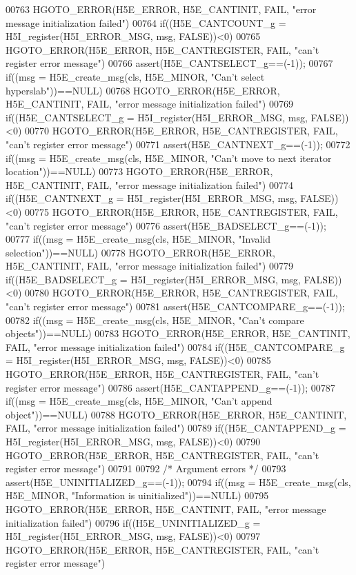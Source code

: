 \begin{DoxyCode}
00763     HGOTO\_ERROR(H5E\_ERROR, H5E\_CANTINIT, FAIL, "error message initialization failed")
00764 if((H5E\_CANTCOUNT\_g = H5I\_register(H5I\_ERROR\_MSG, msg, FALSE))<0)
00765     HGOTO\_ERROR(H5E\_ERROR, H5E\_CANTREGISTER, FAIL, "can't register error message")
00766 assert(H5E\_CANTSELECT\_g==(-1));
00767 if((msg = H5E\_create\_msg(cls, H5E\_MINOR, "Can't select hyperslab"))==NULL)
00768     HGOTO\_ERROR(H5E\_ERROR, H5E\_CANTINIT, FAIL, "error message initialization failed")
00769 if((H5E\_CANTSELECT\_g = H5I\_register(H5I\_ERROR\_MSG, msg, FALSE))<0)
00770     HGOTO\_ERROR(H5E\_ERROR, H5E\_CANTREGISTER, FAIL, "can't register error message")
00771 assert(H5E\_CANTNEXT\_g==(-1));
00772 if((msg = H5E\_create\_msg(cls, H5E\_MINOR, "Can't move to next iterator location"))==NULL)
00773     HGOTO\_ERROR(H5E\_ERROR, H5E\_CANTINIT, FAIL, "error message initialization failed")
00774 if((H5E\_CANTNEXT\_g = H5I\_register(H5I\_ERROR\_MSG, msg, FALSE))<0)
00775     HGOTO\_ERROR(H5E\_ERROR, H5E\_CANTREGISTER, FAIL, "can't register error message")
00776 assert(H5E\_BADSELECT\_g==(-1));
00777 if((msg = H5E\_create\_msg(cls, H5E\_MINOR, "Invalid selection"))==NULL)
00778     HGOTO\_ERROR(H5E\_ERROR, H5E\_CANTINIT, FAIL, "error message initialization failed")
00779 if((H5E\_BADSELECT\_g = H5I\_register(H5I\_ERROR\_MSG, msg, FALSE))<0)
00780     HGOTO\_ERROR(H5E\_ERROR, H5E\_CANTREGISTER, FAIL, "can't register error message")
00781 assert(H5E\_CANTCOMPARE\_g==(-1));
00782 if((msg = H5E\_create\_msg(cls, H5E\_MINOR, "Can't compare objects"))==NULL)
00783     HGOTO\_ERROR(H5E\_ERROR, H5E\_CANTINIT, FAIL, "error message initialization failed")
00784 if((H5E\_CANTCOMPARE\_g = H5I\_register(H5I\_ERROR\_MSG, msg, FALSE))<0)
00785     HGOTO\_ERROR(H5E\_ERROR, H5E\_CANTREGISTER, FAIL, "can't register error message")
00786 assert(H5E\_CANTAPPEND\_g==(-1));
00787 if((msg = H5E\_create\_msg(cls, H5E\_MINOR, "Can't append \textcolor{keywordtype}{object}"))==NULL)
00788     HGOTO\_ERROR(H5E\_ERROR, H5E\_CANTINIT, FAIL, "error message initialization failed")
00789 if((H5E\_CANTAPPEND\_g = H5I\_register(H5I\_ERROR\_MSG, msg, FALSE))<0)
00790     HGOTO\_ERROR(H5E\_ERROR, H5E\_CANTREGISTER, FAIL, "can't register error message")
00791 
00792 \textcolor{comment}{/* Argument errors */}
00793 assert(H5E\_UNINITIALIZED\_g==(-1));
00794 if((msg = H5E\_create\_msg(cls, H5E\_MINOR, "Information is uinitialized"))==NULL)
00795     HGOTO\_ERROR(H5E\_ERROR, H5E\_CANTINIT, FAIL, "error message initialization failed")
00796 if((H5E\_UNINITIALIZED\_g = H5I\_register(H5I\_ERROR\_MSG, msg, FALSE))<0)
00797     HGOTO\_ERROR(H5E\_ERROR, H5E\_CANTREGISTER, FAIL, "can't register error message")

\end{DoxyCode}
